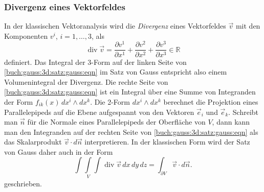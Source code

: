 %
%
\subsubsection{Divergenz eines Vektorfeldes}
In der klassischen Vektoranalysis wird die {\em Divergenz} eines Vektorfeldes
%
$\vec{v}$ mit den Komponenten $v^i$, $i=1,\dots,3$, als
\[
\operatorname{div}\vec{v}
=
\frac{\partial v^1}{\partial x^1}
+
\frac{\partial v^2}{\partial x^2}
+
\frac{\partial v^3}{\partial x^3}
\in
\mathbb{R}
\]
definiert.
Das Integral der 3-Form auf der linken Seite von
\eqref{buch:gauss:3d:satz:gauss:eqn}
im Satz von Gauss entspricht also einem Volumenintegral
der Divergenz.
%
Die rechte Seite von \eqref{buch:gauss:3d:satz:gauss:eqn}
ist ein Integral über eine Summe von Integranden der Form
$f_{ik}(x)\,dx^i\wedge dx^k$.
Die 2-Form $dx^i\wedge dx^k$ berechnet die Projektion eines
Parallelepipeds auf die Ebene aufgespannt von den Vektoren
$\vec{e}_i$ und $\vec{e}_k$.
Schreibt man $\vec{n}$ für die Normale eines Parallelepipeds
der Oberfläche von $V$, dann kann man den Integranden
%
auf der rechten Seite von \eqref{buch:gauss:3d:satz:gauss:eqn}
als das Skalarprodukt $\vec{v}\cdot d\vec{n}$ interpretieren.
In der klassischen Form wird der Satz von Gauss daher auch
in der Form
\[
\underset{V}{\int\!\!\!\int\!\!\!\int}
\operatorname{div}\vec{v}
\,dx\,dy\,dz
=
\int_{\partial V}\vec{v}\cdot d\vec{n}.
\]
geschrieben.

